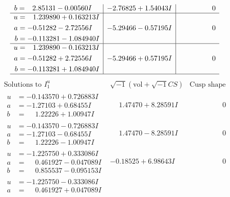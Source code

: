\documentclass[1p]{elsarticle_modified}
\theoremstyle{definition}
\newcommand{\I}{\sqrt{-1}}
\begin{document}
$$\begin{array}{c|c|c}
\begin{aligned}
b &= \phantom{-}2.85131 - 0.00560 I\end{aligned}
 & -2.76825 + 1.54043 I & \phantom{-0.000000 } 0 \\ \hline\begin{aligned}
u &= \phantom{-}1.239890 + 0.163213 I \\
a &= -0.51282 - 2.72556 I \\
b &= -0.113281 - 1.084940 I\end{aligned}
 & -5.29466 - 0.57195 I & \phantom{-0.000000 } 0 \\ \hline\begin{aligned}
u &= \phantom{-}1.239890 - 0.163213 I \\
a &= -0.51282 + 2.72556 I \\
b &= -0.113281 + 1.084940 I\end{aligned}
 & -5.29466 + 0.57195 I & \phantom{-0.000000 } 0\\
 \hline 
 \end{array}$$\newpage$$\begin{array}{c|c|c}  
\text{Solutions to }I^u_{1}& \I (\text{vol} + \sqrt{-1}CS) & \text{Cusp shape}\\
 \hline 
\begin{aligned}
u &= -0.143570 + 0.726883 I \\
a &= -1.27103 + 0.68455 I \\
b &= \phantom{-}1.22226 + 1.00947 I\end{aligned}
 & \phantom{-}1.47470 + 8.28591 I & \phantom{-0.000000 } 0 \\ \hline\begin{aligned}
u &= -0.143570 - 0.726883 I \\
a &= -1.27103 - 0.68455 I \\
b &= \phantom{-}1.22226 - 1.00947 I\end{aligned}
 & \phantom{-}1.47470 - 8.28591 I & \phantom{-0.000000 } 0 \\ \hline\begin{aligned}
u &= -1.225750 + 0.333086 I \\
a &= \phantom{-}0.461927 - 0.047089 I \\
b &= \phantom{-}0.855537 - 0.095153 I\end{aligned}
 & -0.18525 + 6.98643 I & \phantom{-0.000000 } 0 \\ \hline\begin{aligned}
u &= -1.225750 - 0.333086 I \\
a &= \phantom{-}0.461927 + 0.047089 I \\

\end{aligned}
\end{array}$$
\end{document}
